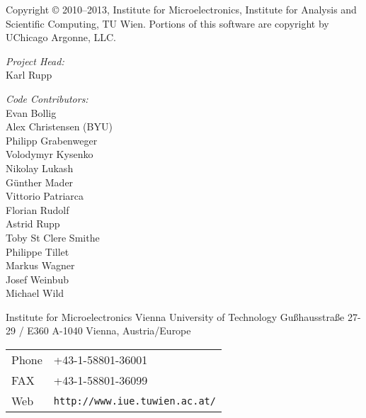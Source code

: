 
\clearpage

Copyright {\copyright} 2010--2013, Institute for Microelectronics,
                            Institute for Analysis and Scientific Computing,
                            TU Wien.
Portions of this software are copyright by UChicago Argonne, LLC.

\vspace{2.cm}

\textit{Project Head:}\\

Karl Rupp\\

\vspace{2.cm}

\textit{Code Contributors:} \\

Evan Bollig \\
Alex Christensen (BYU) \\
Philipp Grabenweger \\
Volodymyr Kysenko \\
Nikolay Lukash \\
G\"unther Mader \\
Vittorio Patriarca \\
Florian Rudolf \\
Astrid Rupp \\
Toby St Clere Smithe \\
Philippe Tillet \\
Markus Wagner \\
Josef Weinbub \\
Michael Wild \\



\vspace{3.5cm}

Institute for Microelectronics\newline
Vienna University of Technology\newline
Gu\ss hausstra\ss e 27-29 / E360\newline
A-1040 Vienna, Austria/Europe\newline


\begin{tabular}{ll}
Phone  & +43-1-58801-36001\\
FAX    & +43-1-58801-36099\\
Web    & \texttt{http://www.iue.tuwien.ac.at/}
\end{tabular}



